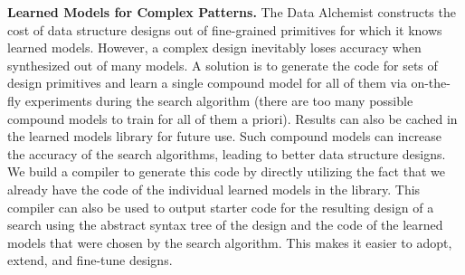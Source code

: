 \documentclass[11pt]{article}
\begin{document}
\textbf{Learned Models for Complex Patterns.}
The Data Alchemist constructs the cost of data structure designs out of fine-grained primitives for which it knows learned models. However, a complex design inevitably loses accuracy when synthesized out of many models. A solution is to generate the code for sets of design primitives and learn a single compound model for all of them via on-the-fly experiments during the search algorithm (there are too many possible compound models to train for all of them a priori). Results can also be cached in the learned models library for future use. Such compound models can increase the accuracy of the search algorithms, leading to better data structure designs. We build a compiler to generate this code by directly utilizing the fact that we already have the code of the individual learned models in the library. This compiler can also be used to output starter code for the resulting design of a search using the abstract syntax tree of the design and the code of the learned models that were chosen by the search algorithm. This makes it easier to adopt, extend, and fine-tune designs. 
\end{document}
